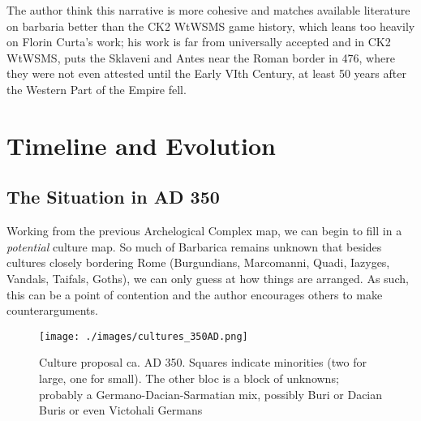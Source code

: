 \documentclass{article}
\begin{document}
	The author think this narrative is more cohesive and matches available literature on barbaria better than the CK2 WtWSMS game history, which leans too heavily on Florin Curta’s work; his work is far from universally accepted and in CK2 WtWSMS, puts the Sklaveni and Antes near the Roman border in 476, where they were not even attested until the Early VIth Century, at least 50 years after the Western Part of the Empire fell. 
	
	\section{Timeline and Evolution}
	\label{sec:timeline}
	
	\subsection{The Situation in AD 350}
	\label{sec:timeline:subsec:350}
	
	Working from the previous Archelogical Complex map, we can begin to fill in a \textit{potential} culture map.
	So much of Barbarica remains unknown that besides cultures closely bordering Rome (Burgundians, Marcomanni, Quadi, Iazyges, Vandals, Taifals, Goths), we can only guess at how things are arranged.
	As such, this can be a point of contention and the author encourages others to make counterarguments.
	
	\begin{figure}[h!]
		\centering
		\texttt{[image: ./images/cultures\_350AD.png]}
		\caption{Culture proposal ca. AD 350. Squares indicate minorities (two for large, one for small).
			\newline\tiny The other bloc is a block of unknowns; probably a Germano-Dacian-Sarmatian mix, possibly Buri or Dacian Buris or even Victohali Germans}
	\end{figure}
	
\end{document}
